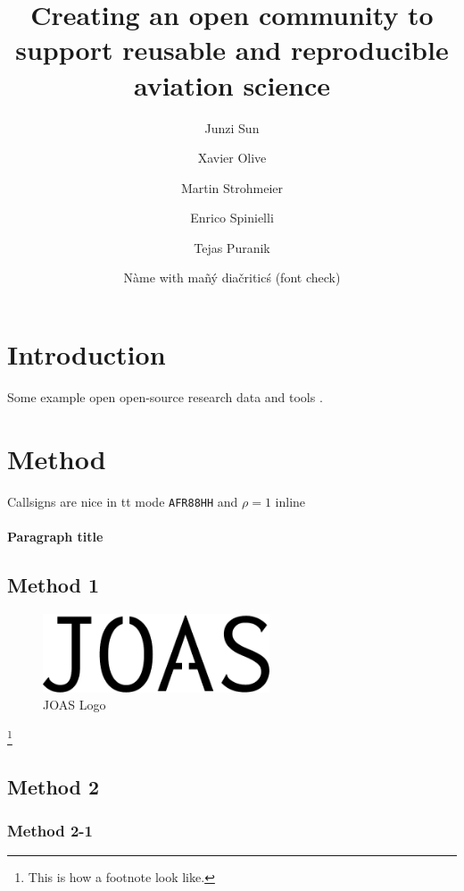 \documentclass[
  manuscript=article,  %
  year=20xx,
  volume=x,
]{joas}
\title{Creating an open community to support reusable and reproducible aviation science}
\author{Junzi Sun}
\affiliation{Joint first authors}
\author{Xavier Olive}
\affiliation{Joint first authors}
\author{Martin Strohmeier}
\affiliation{OpenSky Network, Switzerland}
\author{Enrico Spinielli}
\affiliation{EUROCONTROL, Belgium}
\author{Tejas Puranik}
\affiliation{NASA Ames Research Center, USA}
\author{Nàme with mañý diačriticś (font check)}
\affiliation{University of Syldavia}
\begin{document}
\begin{abstract}
  \blindtext
\end{abstract}

\section{Introduction}

\blindtext Some example open open-source research data \citep{schafer2014bringing} and tools \citep{olive2019traffic,sun2020openap}. 


\blindtext[2]

\blindtext


\section{Method}

Callsigns are nice in tt mode \texttt{AFR88HH} and $\rho = 1$ inline

\paragraph{Paragraph title} \blindtext

\subsection{Method 1}

\blindtext

\begin{figure}[ht!]
  \centering
  \includegraphics[width=0.6\textwidth]{joas-logo.pdf}
  \caption{JOAS Logo}
  \label{fig:logo}
\end{figure}

\blindtext\footnote{This is how a footnote look like.}

\subsection{Method 2}

\subsubsection{Method 2-1}
\end{document}
